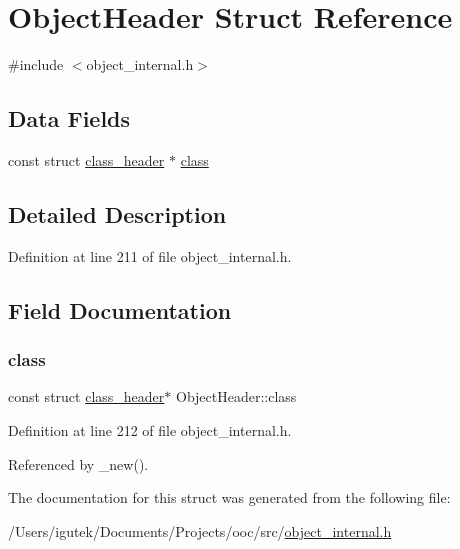 \hypertarget{structObjectHeader}{}\section{Object\+Header Struct Reference}
\label{structObjectHeader}


{\ttfamily \#include $<$object\+\_\+internal.\+h$>$}

\subsection*{Data Fields}
\begin{DoxyCompactItemize}
\item 
const struct \mbox{\hyperlink{structclass__header}{class\+\_\+header}} $\ast$ \mbox{\hyperlink{structObjectHeader_a35e7f1485a6bee012c479fe61ff8717d}{class}}
\end{DoxyCompactItemize}


\subsection{Detailed Description}


Definition at line 211 of file object\+\_\+internal.\+h.



\subsection{Field Documentation}
\mbox{\label{structObjectHeader_a35e7f1485a6bee012c479fe61ff8717d}} 
\subsubsection{\texorpdfstring{class}{class}}
{\footnotesize\ttfamily const struct \mbox{\hyperlink{structclass__header}{class\+\_\+header}}$\ast$ Object\+Header\+::class}



Definition at line 212 of file object\+\_\+internal.\+h.



Referenced by \+\_\+new().



The documentation for this struct was generated from the following file\+:\begin{DoxyCompactItemize}
\item 
/\+Users/igutek/\+Documents/\+Projects/ooc/src/\mbox{\hyperlink{object__internal_8h}{object\+\_\+internal.\+h}}\end{DoxyCompactItemize}
